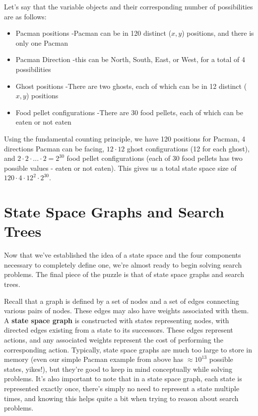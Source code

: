 \documentclass{article}[letterpaper]
\begin{document}
Let’s say that the variable objects and their corresponding number of possibilities are as follows:
\begin{itemize}
\item  Pacman positions -Pacman can be in 120 distinct ($x,y$) positions, and there is only one Pacman
\item Pacman Direction -this can be North, South, East, or West, for a total of 4 possibilities 
\item Ghost positions -There are two ghosts, each of which can be in 12 distinct ($x,y$) positions
\item Food pellet configurations -There are 30 food pellets, each of which can be eaten or not eaten
\end{itemize}

Using the fundamental counting principle, we have 120 positions for Pacman, 4 directions Pacman can be facing, $12 \cdot 12$ ghost configurations (12 for each ghost), and $2 \cdot 2 \cdot ...\cdot 2 = 2^{30}$ food pellet configurations (each of 30 food pellets has two possible values - eaten or not eaten). This gives us a total state space size of $120 \cdot 4 \cdot 12^2 \cdot 2^{30}$.

\section*{State Space Graphs and Search Trees}
Now that we’ve established the idea of a state space and the four components necessary to completely define one, we’re almost ready to begin solving search problems. The final piece of the puzzle is that of state space graphs and search trees.

Recall that a graph is defined by a set of nodes and a set of edges connecting various pairs of nodes. These edges may also have weights associated with them. A \textbf{state space graph} is constructed with states representing nodes, with directed edges existing from a state to its successors. These edges represent actions, and any associated weights represent the cost of performing the corresponding action. Typically, state space graphs are much too large to store in memory (even our simple Pacman example from above has $\approx 10^{13}$ possible states, yikes!), but they’re good to keep in mind conceptually while solving problems. It’s also important to note that in a state space graph, each state is represented exactly once, there’s simply no need to represent a state multiple times, and knowing this helps quite a bit when trying to reason about search problems.
\end{document}
